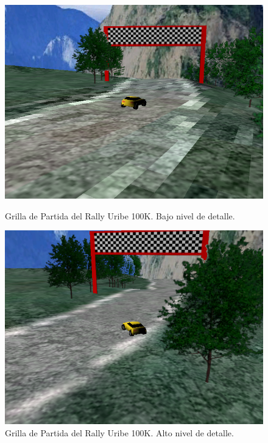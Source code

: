 \documentclass[a4paper,11pt]{article}
\begin{document}
\begin{figure}
\begin{minipage}[b]{0.5\linewidth}
\centering
 \includegraphics[scale=0.250]{./startinggrid.png}
 \caption{Grilla de Partida del Rally Uribe 100K. Bajo nivel de detalle.}
\label{fig:figure1}
\end{minipage}
\hspace{0.5cm}
\begin{minipage}[b]{0.5\linewidth}
\centering
 \includegraphics[scale=0.250]{./startinggrid_high.png}
 \caption{Grilla de Partida del Rally Uribe 100K. Alto nivel de detalle.}
\label{fig:figure2}
\end{minipage}
\end{figure}
\end{document}
